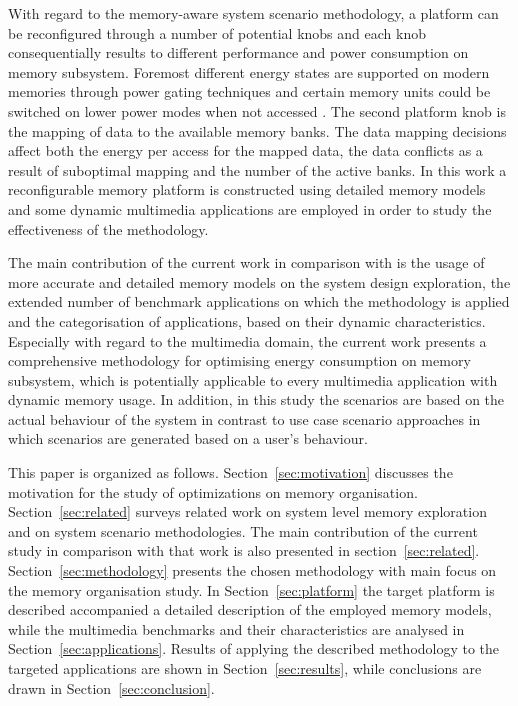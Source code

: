\documentclass[a4paper,conference]{IEEEtran}
\begin{document}
With regard to the memory-aware system scenario methodology, a platform can be reconfigured through a number of potential knobs and each knob consequentially results to different performance and power consumption on memory subsystem. Foremost different energy states are supported on modern memories through power gating techniques and certain memory units could be switched on lower power modes when not accessed \cite{Fil12}. The second platform knob is the mapping of data to the available memory banks. The data mapping decisions affect both the energy per access for the mapped data, the data conflicts as a result of suboptimal mapping and the number of the active banks. In this work a reconfigurable memory platform is constructed using detailed memory models and some dynamic multimedia applications are employed in order to study the effectiveness of the methodology.

The main contribution of the current work in comparison with \cite{Fil12} is the usage of more accurate and detailed memory models on the system design exploration, the extended number of benchmark applications on which the methodology is applied and the categorisation of applications, based on their dynamic characteristics. Especially with regard to the multimedia domain, the current work presents a comprehensive methodology for optimising energy consumption on memory subsystem, which is potentially applicable to every multimedia application with dynamic memory usage. In addition, in this study the scenarios are based on the actual behaviour of the system in contrast to use case scenario approaches in which scenarios are generated based on a user's behaviour.

This paper is organized as follows. Section~\ref{sec:motivation} discusses the motivation for the study of optimizations on memory organisation. Section~\ref{sec:related} surveys related work on system level memory exploration and on system scenario methodologies. The main contribution of the current study in comparison with that work is also presented in section~\ref{sec:related}. Section~\ref{sec:methodology} presents the chosen methodology with main focus on the memory organisation study. In Section~\ref{sec:platform} the target platform is described accompanied a detailed description of the employed memory models, while the multimedia benchmarks and their characteristics are analysed in Section~\ref{sec:applications}. Results of applying the described methodology to the targeted applications are shown in Section~\ref{sec:results}, while conclusions are drawn in Section~\ref{sec:conclusion}. 
\end{document}
